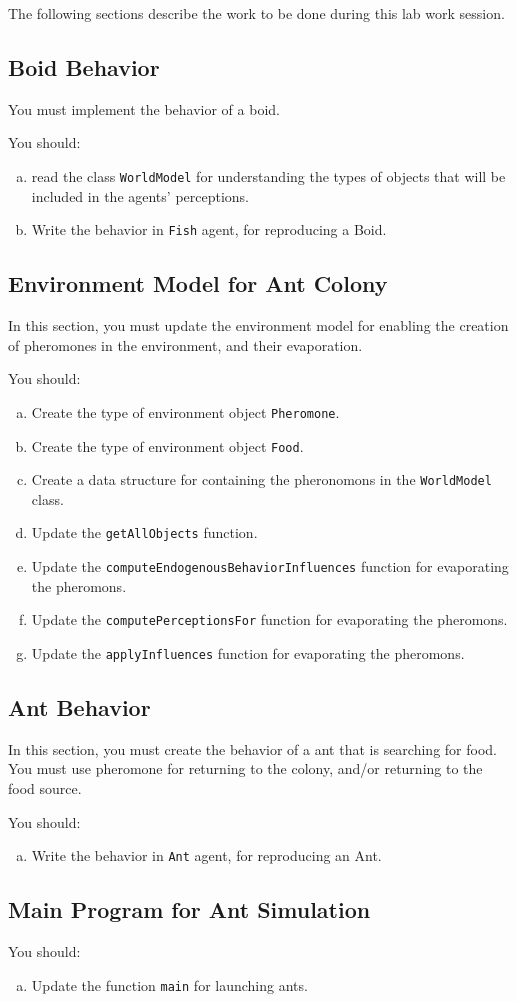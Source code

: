 \documentclass[article,english,nodocumentinfo]{multiagentfrreport}
\begin{document}
The following sections describe the work to be done during this lab work session.

\subsection{Boid Behavior}

You must implement the behavior of a boid.

You should:
\begin{enumerate}[a)]
\item read the class \texttt{WorldModel} for understanding the types of objects that will be included in the agents' perceptions.
\item Write the behavior in \texttt{Fish} agent, for reproducing a Boid.
\end{enumerate}

\subsection{Environment Model for Ant Colony}

In this section, you must update the environment model for enabling the creation of pheromones in the environment, and their evaporation.

You should:
\begin{enumerate}[a)]
\item Create the type of environment object \texttt{Pheromone}.
\item Create the type of environment object \texttt{Food}.
\item Create a data structure for containing the pheronomons in the \texttt{WorldModel} class.
\item Update the \texttt{getAllObjects} function.
\item Update the \texttt{computeEndogenousBehaviorInfluences} function for evaporating the pheromons.
\item Update the \texttt{computePerceptionsFor} function for evaporating the pheromons.
\item Update the \texttt{applyInfluences} function for evaporating the pheromons.
\end{enumerate}

\subsection{Ant Behavior}

In this section, you must create the behavior of a ant that is searching for food.
You must use pheromone for returning to the colony, and/or returning to the food source.

You should:
\begin{enumerate}[a)]
\item Write the behavior in \texttt{Ant} agent, for reproducing an Ant.
\end{enumerate}

\subsection{Main Program for Ant Simulation}

You should:
\begin{enumerate}[a)]
\item Update the function \texttt{main} for launching ants.
\end{enumerate}
\end{document}
